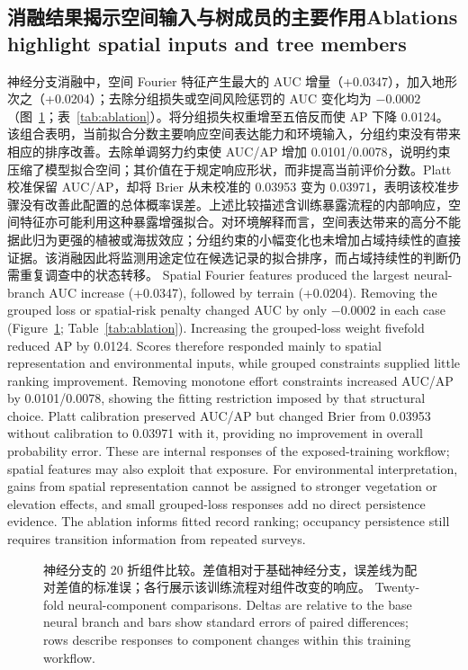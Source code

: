 \subsection{\ifzh 消融结果揭示空间输入与树成员的主要作用\else Ablations highlight spatial inputs and tree members\fi}
\ifzh
神经分支消融中，空间 Fourier 特征产生最大的 AUC 增量（+0.0347），加入地形次之（+0.0204）；去除分组损失或空间风险惩罚的 AUC 变化均为 $-0.0002$（图~\ref{fig:abl}；表~\ref{tab:ablation}）。将分组损失权重增至五倍反而使 AP 下降 0.0124。该组合表明，当前拟合分数主要响应空间表达能力和环境输入，分组约束没有带来相应的排序改善。去除单调努力约束使 AUC/AP 增加 0.0101/0.0078，说明约束压缩了模型拟合空间；其价值在于规定响应形状，而非提高当前评价分数。Platt 校准保留 AUC/AP，却将 Brier 从未校准的 0.03953 变为 0.03971，表明该校准步骤没有改善此配置的总体概率误差。上述比较描述含训练暴露流程的内部响应，空间特征亦可能利用这种暴露增强拟合。对环境解释而言，空间表达带来的高分不能据此归为更强的植被或海拔效应；分组约束的小幅变化也未增加占域持续性的直接证据。该消融因此将监测用途定位在候选记录的拟合排序，而占域持续性的判断仍需重复调查中的状态转移。
\else
Spatial Fourier features produced the largest neural-branch AUC increase (+0.0347), followed by terrain (+0.0204). Removing the grouped loss or spatial-risk penalty changed AUC by only $-0.0002$ in each case (Figure~\ref{fig:abl}; Table~\ref{tab:ablation}). Increasing the grouped-loss weight fivefold reduced AP by 0.0124. Scores therefore responded mainly to spatial representation and environmental inputs, while grouped constraints supplied little ranking improvement. Removing monotone effort constraints increased AUC/AP by 0.0101/0.0078, showing the fitting restriction imposed by that structural choice. Platt calibration preserved AUC/AP but changed Brier from 0.03953 without calibration to 0.03971 with it, providing no improvement in overall probability error. These are internal responses of the exposed-training workflow; spatial features may also exploit that exposure. For environmental interpretation, gains from spatial representation cannot be assigned to stronger vegetation or elevation effects, and small grouped-loss responses add no direct persistence evidence. The ablation informs fitted record ranking; occupancy persistence still requires transition information from repeated surveys.
\fi
\begin{figure}[htbp]\centering{}
\caption{\ifzh
神经分支的 20 折组件比较。差值相对于基础神经分支，误差线为配对差值的标准误；各行展示该训练流程对组件改变的响应。
\else
Twenty-fold neural-component comparisons. Deltas are relative to the base neural branch and bars show standard errors of paired differences; rows describe responses to component changes within this training workflow.
\fi}\label{fig:abl}
\end{figure}
